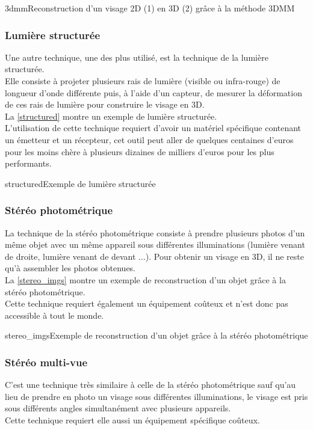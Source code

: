 \documentclass[poster]{polytech/polytech}
\begin{document}
\begin{Figure}{3dmm}{Reconstruction d'un visage 2D (1) en 3D (2) grâce à la méthode 3DMM}
\end{Figure}

\subsubsection{Lumière structurée}
\label{struc_light}
Une autre technique, une des plus utilisé, est la technique de la lumière structurée.\\
Elle consiste à projeter plusieurs rais de lumière (visible ou infra-rouge) de longueur d'onde différente puis, à l'aide d'un capteur, de mesurer la déformation de ces rais de lumière pour construire le visage en 3D.\\
La \autoref{structured} montre un exemple de lumière structurée.\\
L'utilisation de cette technique requiert d'avoir un matériel spécifique contenant un émetteur et un récepteur, cet outil peut aller de quelques centaines d'euros pour les moins chère à plusieurs dizaines de milliers d'euros pour les plus performants.

\begin{Figure}{structured}{Exemple de lumière structurée}
\end{Figure}

\subsubsection{Stéréo photométrique}
\label{photo_stereo}
La technique de la stéréo photométrique consiste à prendre plusieurs photos d'un même objet avec un même appareil sous différentes illuminations (lumière venant de droite, lumière venant de devant ...). Pour obtenir un visage en 3D, il ne reste qu'à assembler les photos obtenues.\\
La \autoref{stereo_imgs} montre un exemple de reconstruction d'un objet grâce à la stéréo photométrique.\\
Cette technique requiert également un équipement coûteux et n'est donc pas accessible à tout le monde.

\begin{Figure}{stereo_imgs}{Exemple de reconstruction d'un objet grâce à la stéréo photométrique}
\end{Figure}


\subsubsection{Stéréo multi-vue}
\label{multi_stereo}
C'est une technique très similaire à celle de la stéréo photométrique sauf qu'au lieu de prendre en photo un visage sous différentes illuminations, le visage est pris sous différents angles simultanément avec plusieurs appareils.\\
Cette technique requiert elle aussi un équipement spécifique coûteux.\\
\\
\\
\end{document}
